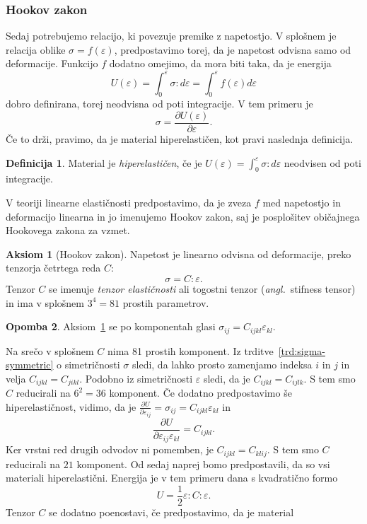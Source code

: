 \documentclass[12pt,a4paper,twoside]{article}
\theoremstyle{definition} %
\newtheorem{definicija}{Definicija}[section]
\newtheorem{opomba}[definicija]{Opomba}
\newtheorem{aksiom}{Aksiom}
\theoremstyle{plain} %
\numberwithin{equation}{section}
\newcommand{\eps}{\varepsilon}
\newcommand{\dpar}[2]{\ensuremath{\frac{\partial #1}{\partial #2}}}
\newcommand{\ts}{\sigma}
\newcommand{\ang}[1]{(\textit{angl.}\ #1)}
\begin{document}
\subsubsection{Hookov zakon}
Sedaj potrebujemo relacijo, ki povezuje premike z napetostjo.  V splošnem je relacija oblike $\ts =
f(\eps)$, predpostavimo torej, da je napetost odvisna samo od deformacije. Funkcijo $f$ dodatno
omejimo, da mora biti taka, da je energija
\[
  U(\eps) = \int_{0}^{\eps} \ts : d\eps = \int_0^\eps f(\eps) d\eps
\]
dobro definirana, torej neodvisna od poti integracije. V tem primeru je
\[
  \ts = \dpar{U(\eps)}{\eps}.
\]
Če to drži, pravimo, da je material hiperelastičen, kot pravi naslednja
definicija.
\begin{definicija}
  Material je \emph{hiperelastičen}, če je $U(\eps) = \int_0^\eps \ts:d\eps$ neodvisen
  od poti integracije.
\end{definicija}
V teoriji linearne elastičnosti
predpostavimo, da je zveza $f$ med napetostjo in deformacijo linearna in jo
imenujemo Hookov zakon, saj je posplošitev običajnega Hookovega zakona za vzmet.
\begin{aksiom}[Hookov zakon]
  \label{aks:hook}
  Napetost je linearno odvisna od deformacije, preko tenzorja četrtega reda $C$:
  \[ \ts = C:\eps. \]
  Tenzor $C$ se imenuje \emph{tenzor elastičnosti} ali togostni tenzor
  \ang{stifness tensor} in ima v splošnem $3^4 = 81$ prostih parametrov.
\end{aksiom}
\begin{opomba}
  Aksiom~\ref{aks:hook} se po komponentah glasi $\ts_{ij} = C_{ijkl}
  \eps_{kl}$.
\end{opomba}
Na srečo v splošnem $C$ nima 81 prostih komponent.
Iz trditve~\ref{trd:sigma-symmetric} o simetričnosti $\ts$ sledi, da lahko
prosto zamenjamo indeksa $i$ in $j$ in velja $C_{ijkl} = C_{jikl}$.
Podobno iz simetričnosti $\eps$ sledi, da je $C_{ijkl} = C_{ijlk}$.
S tem smo $C$ reducirali na $6^2 = 36$ komponent.
Če dodatno predpostavimo še hiperelastičnost, vidimo, da je $\dpar{U}{\eps_{ij}}
= \sigma_{ij} = C_{ijkl}\eps_{kl}$ in
\[
  \dpar{U}{\eps_{ij}\eps_{kl}} = C_{ijkl}.
\]
Ker vrstni red drugih odvodov ni pomemben, je $C_{ijkl} = C_{klij}$.
S tem smo $C$ reducirali na $21$ komponent.
Od sedaj naprej bomo predpostavili, da so vsi materiali hiperelastični.
Energija je v tem primeru dana s kvadratično formo
\begin{equation}
  U = \frac12 \eps:C:\eps.
  \label{eq:energy}
\end{equation}
Tenzor $C$ se dodatno poenostavi, če predpostavimo, da je material
\end{document}
